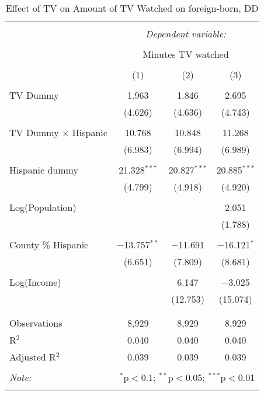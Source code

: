 
\begin{table}[!htbp] \centering 
  \caption{Effect of TV on Amount of TV Watched on foreign-born, DD} 
  \label{} 
\begin{tabular}{@{\extracolsep{-5pt}}lccc} 
\\[-1.8ex]\hline 
\hline \\[-1.8ex] 
 & \multicolumn{3}{c}{\textit{Dependent variable:}} \\ 
\cline{2-4} 
\\[-1.8ex] & \multicolumn{3}{c}{Minutes TV watched} \\ 
\\[-1.8ex] & (1) & (2) & (3)\\ 
\hline \\[-1.8ex] 
 TV Dummy & 1.963 & 1.846 & 2.695 \\ 
  & (4.626) & (4.636) & (4.743) \\ 
  & & & \\ 
 TV Dummy $\times$ Hispanic  & 10.768 & 10.848 & 11.268 \\ 
  & (6.983) & (6.994) & (6.989) \\ 
  & & & \\ 
 Hispanic dummy & 21.328$^{***}$ & 20.827$^{***}$ & 20.885$^{***}$ \\ 
  & (4.799) & (4.918) & (4.920) \\ 
  & & & \\ 
 Log(Population) &  &  & 2.051 \\ 
  &  &  & (1.788) \\ 
  & & & \\ 
 County \% Hispanic & $-$13.757$^{**}$ & $-$11.691 & $-$16.121$^{*}$ \\ 
  & (6.651) & (7.809) & (8.681) \\ 
  & & & \\ 
 Log(Income) &  & 6.147 & $-$3.025 \\ 
  &  & (12.753) & (15.074) \\ 
  & & & \\ 
\hline \\[-1.8ex] 
Observations & 8,929 & 8,929 & 8,929 \\ 
R$^{2}$ & 0.040 & 0.040 & 0.040 \\ 
Adjusted R$^{2}$ & 0.039 & 0.039 & 0.039 \\ 
\hline 
\hline \\[-1.8ex] 
\textit{Note:}  & \multicolumn{3}{r}{$^{*}$p$<$0.1; $^{**}$p$<$0.05; $^{***}$p$<$0.01} \\ 
 & \multicolumn{3}{r}{} \\ 
\end{tabular} 
\end{table} 
